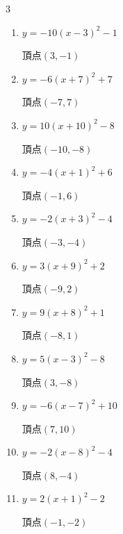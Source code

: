 \begin{multicols}{3}
\begin{enumerate}
        $\displaystyle 頂点\left( 6 , 6 \right)$

  \item $\displaystyle y=-10\left( x-3\right)^{2}-1$

        $\displaystyle 頂点\left( 3 , -1 \right)$

  \item $\displaystyle y=-6\left( x+7\right)^{2}+7$

        $\displaystyle 頂点\left( -7 , 7 \right)$

  \item $\displaystyle y=10\left( x+10\right)^{2}-8$

        $\displaystyle 頂点\left( -10 , -8 \right)$

  \item $\displaystyle y=-4\left( x+1\right)^{2}+6$

        $\displaystyle 頂点\left( -1 , 6 \right)$

  \item $\displaystyle y=-2\left( x+3\right)^{2}-4$

        $\displaystyle 頂点\left( -3 , -4 \right)$

  \item $\displaystyle y=3\left( x+9\right)^{2}+2$

        $\displaystyle 頂点\left( -9 , 2 \right)$

  \item $\displaystyle y=9\left( x+8\right)^{2}+1$

        $\displaystyle 頂点\left( -8 , 1 \right)$

  \item $\displaystyle y=5\left( x-3\right)^{2}-8$

        $\displaystyle 頂点\left( 3 , -8 \right)$

  \item $\displaystyle y=-6\left( x-7\right)^{2}+10$

        $\displaystyle 頂点\left( 7 , 10 \right)$

  \item $\displaystyle y=-2\left( x-8\right)^{2}-4$

        $\displaystyle 頂点\left( 8 , -4 \right)$

\columnbreak %

  \item $\displaystyle y=2\left( x+1\right)^{2}-2$

        $\displaystyle 頂点\left( -1 , -2 \right)$


\end{enumerate}
\end{multicols}
